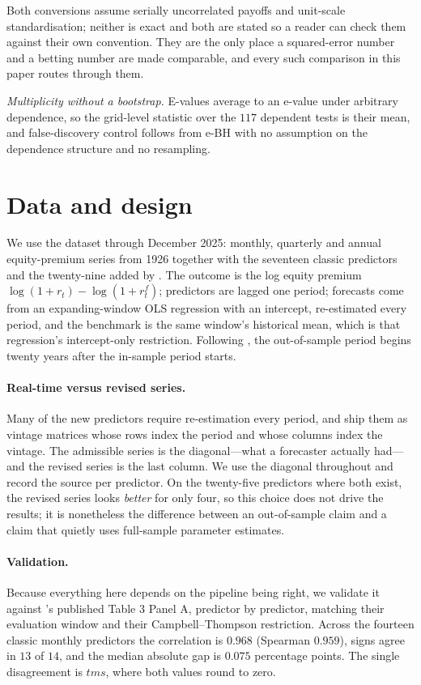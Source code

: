 \documentclass{article}
\theoremstyle{plain}
\theoremstyle{definition}
\begin{document}
Both conversions assume serially uncorrelated payoffs and unit-scale standardisation; neither is
exact and both are stated so a reader can check them against their own convention. They are the
only place a squared-error number and a betting number are made comparable, and every such
comparison in this paper routes through them.

\emph{Multiplicity without a bootstrap.} E-values average to an e-value under arbitrary
dependence, so the grid-level statistic over the $117$ dependent tests is their mean, and
false-discovery control follows from e-BH \citep{wang2022} with no assumption on the dependence
structure and no resampling.

\section{Data and design}
\label{sec:data}

We use the \citet{goyal2024} dataset through December 2025: monthly, quarterly and annual
equity-premium series from 1926 together with the seventeen classic \citet{welch2008}
predictors and the twenty-nine added by \citeauthor{goyal2024}. The outcome is the log equity
premium $\log(1+r_t)-\log(1+r^f_t)$; predictors are lagged one period; forecasts come from an
expanding-window OLS regression with an intercept, re-estimated every period, and the
benchmark is the same window's historical mean, which is that regression's intercept-only
restriction. Following \citeauthor{goyal2024}, the out-of-sample period begins twenty years
after the in-sample period starts.

\paragraph{Real-time versus revised series.} Many of the new predictors require re-estimation
every period, and \citeauthor{goyal2024} ship them as vintage matrices whose rows index the
period and whose columns index the vintage. The admissible series is the diagonal---what a
forecaster actually had---and the revised series is the last column. We use the diagonal
throughout and record the source per predictor. On the twenty-five predictors where both
exist, the revised series looks \emph{better} for only four, so this choice does not drive the
results; it is nonetheless the difference between an out-of-sample claim and a claim that
quietly uses full-sample parameter estimates.

\paragraph{Validation.} Because everything here depends on the pipeline being right, we
validate it against \citeauthor{goyal2024}'s published Table 3 Panel A, predictor by
predictor, matching their evaluation window and their Campbell--Thompson restriction. Across
the fourteen classic monthly predictors the correlation is $0.968$ (Spearman $0.959$), signs
agree in $13$ of $14$, and the median absolute gap is $0.075$ percentage points. The single
disagreement is $tms$, where both values round to zero.
\end{document}
